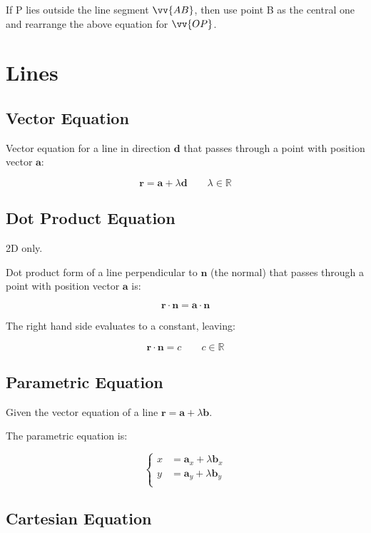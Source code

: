 \documentclass[a4paper,11pt]{article}
\newcommand{\bb}{\boldsymbol}
\begin{document}
If P lies outside the line segment $\vv{AB}$, then use point B as the central
one and rearrange the above equation for $\vv{OP}$.




\section{Lines}

\subsection{Vector Equation}

Vector equation for a line in direction $\bb{d}$ that passes through a point
with position vector $\bb{a}$:

$$
\bb{r} = \bb{a} + \lambda \bb{d} \qquad \lambda \in \mathbb{R}
$$


\subsection{Dot Product Equation}

2D only.

Dot product form of a line perpendicular to $\bb{n}$ (the normal) that passes
through a point with position vector $\bb{a}$ is:

$$
\bb{r} \cdot \bb{n} = \bb{a} \cdot \bb{n}
$$

The right hand side evaluates to a constant, leaving:

$$
\bb{r} \cdot \bb{n} = c \qquad c \in \mathbb{R}
$$


\subsection{Parametric Equation}

Given the vector equation of a line $\bb{r} = \bb{a} + \lambda \bb{b}$.

The parametric equation is:

$$
\begin{cases}
x & = \bb{a}_x + \lambda \bb{b}_x \\
y & = \bb{a}_y + \lambda \bb{b}_y \\
\end{cases}
$$


\subsection{Cartesian Equation}
\end{document}
